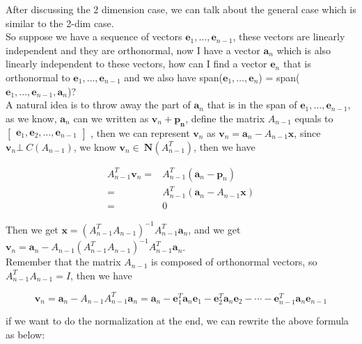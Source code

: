 \documentclass{article}
\begin{document}
After discussing the 2 dimension case, we can talk about the general case which is similar to the 2-dim case.
\\

So suppose we have a sequence of vectors
\( \mathbf{e}_1, \ldots, \mathbf{e}_{n-1} \), these vectors are linearly independent and they are orthonormal, now I have a vector \( \mathbf{a}_n \) which is
also linearly independent to these vectors, how can I find a vector \( \mathbf{e}_n \) that is orthonormal to \( \mathbf{e}_1, \ldots, \mathbf{e}_{n-1} \) and we also have
span{(\( \mathbf{e}_1, \ldots, \mathbf{e}_n \))} = span{(\( \mathbf{e}_1, \ldots, \mathbf{e}_{n-1}, \mathbf{a}_n \))}?
\\

A natural idea is to throw away the part of \( \mathbf{a}_n \) that is in the span of \( \mathbf{e}_1, \ldots, \mathbf{e}_{n-1} \), as we know,
\( \mathbf{a}_n \) can we written as \( \mathbf{v}_n + \mathbf{p_n} \), define the matrix \( A_{n-1} \) equals to \( \begin{bmatrix}
    \mathbf{e}_1, \mathbf{e}_2, \ldots, \mathbf{e}_{n-1}
\end{bmatrix} \)
, then we can represent \( \mathbf{v}_n \) as \( \mathbf{v}_n = \mathbf{a}_n - A_{n-1}\mathbf{x} \), since \( \mathbf{v}_n \bot\ C(A_{n-1}) \), we know
\( \mathbf{v}_n \in\ \mathbf{N}(A_{n-1}^T) \), then we have

\[
    \begin{split}
        A_{n-1}^T\mathbf{v}_n =& A_{n-1}^T(\mathbf{a}_n - \mathbf{p}_n)  \\
                        =& A_{n-1}^T(\mathbf{a}_n - A_{n-1}\mathbf{x}) \\
                        =& 0
    \end{split}
\]

Then we get \( \mathbf{x} = {(A_{n-1}^T A_{n-1})}^{-1} A_{n-1}^T \mathbf{a}_n\),
and we get \( \mathbf{v}_n = \mathbf{a}_n - A_{n-1} {(A_{n-1}^T A_{n-1})}^{-1}A_{n-1}^T \mathbf{a}_n \).
\\

Remember that the matrix \( A_{n-1} \) is composed of orthonormal vectors, so \( A_{n-1}^T A_{n-1} = I \), then we have

\[ 
    \mathbf{v}_n = \mathbf{a}_n - A_{n-1} A_{n-1}^T \mathbf{a}_n  = \mathbf{a}_n - \mathbf{e}_1^T \mathbf{a}_n \mathbf{e}_1 - \mathbf{e}_2^T \mathbf{a}_n \mathbf{e}_2 - \cdots - \mathbf{e}_{n-1}^T \mathbf{a}_n \mathbf{e}_{n-1}
\]

if we want to do the normalization at the end, we can rewrite the above formula as below:
\end{document}
